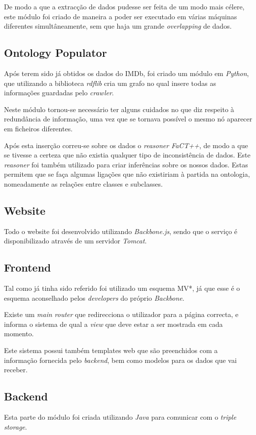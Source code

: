 \documentclass[a4paper]{article}
\begin{document}
De modo a que a extracção de dados pudesse ser feita de um modo mais célere, este módulo foi criado de maneira a poder ser executado em várias máquinas diferentes simultâneamente, sem que haja um grande \textit{overlapping} de dados.

\subsection{Ontology Populator}
\indent \indent Após terem sido já obtidos os dados do IMDb, foi criado um módulo em \textit{Python}, que utilizando a biblioteca \textit{rdflib} cria um grafo no qual insere todas as informações guardadas pelo \textit{crawler}.

Neste módulo tornou-se necessário ter alguns cuidados no que diz respeito à redundância de informação, uma vez que se tornava possível o mesmo nó aparecer em ficheiros diferentes.

Após esta inserção correu-se sobre os dados o \textit{reasoner FaCT++}, de modo a que se tivesse a certeza que não existia qualquer tipo de inconsistência de dados. Este \textit{reasoner} foi também utilizado para criar inferências sobre os nossos dados. Estas permitem que se faça algumas ligações que não existiriam à partida na ontologia, nomeadamente as relações entre classes e subclasses.

\subsection{Website}
\indent \indent Todo o website foi desenvolvido utilizando \textit{Backbone.js}, sendo que o serviço é disponibilizado através de um servidor \textit{Tomcat}.

\subsection{Frontend}
\indent \indent Tal como já tinha sido referido foi utilizado um esquema MV*, já que esse é o esquema aconselhado pelos \textit{developers} do próprio \textit{Backbone}.

Existe um \textit{main router} que redirecciona o utilizador para a página correcta, e informa o sistema de qual a \textit{view} que deve estar a ser mostrada em cada momento.

Este sistema possui também templates web que são preenchidos com a informação fornecida pelo \textit{backend}, bem como modelos para os dados que vai receber.

\subsection{Backend}
\indent \indent Esta parte do módulo foi criada utilizando \textit{Java} para comunicar com o \textit{triple storage}.
\end{document}

